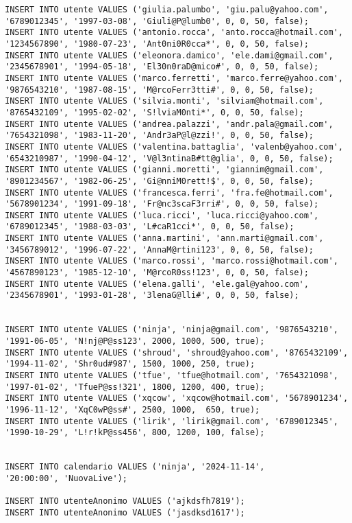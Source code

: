 \begin{lstlisting}
INSERT INTO utente VALUES ('giulia.palumbo', 'giu.palu@yahoo.com',
'6789012345', '1997-03-08', 'Giuli@P@lumb0', 0, 0, 50, false);
INSERT INTO utente VALUES ('antonio.rocca', 'anto.rocca@hotmail.com',
'1234567890', '1980-07-23', 'Ant0ni0R0cca*', 0, 0, 50, false);
INSERT INTO utente VALUES ('eleonora.damico', 'ele.dami@gmail.com',
'2345678901', '1994-05-18', 'El30n0raD@mico#', 0, 0, 50, false);
INSERT INTO utente VALUES ('marco.ferretti', 'marco.ferre@yahoo.com',
'9876543210', '1987-08-15', 'M@rcoFerr3tti#', 0, 0, 50, false);
INSERT INTO utente VALUES ('silvia.monti', 'silviam@hotmail.com',
'8765432109', '1995-02-02', 'S!lviaM0nti*', 0, 0, 50, false);
INSERT INTO utente VALUES ('andrea.palazzi', 'andr.pala@gmail.com',
'7654321098', '1983-11-20', 'Andr3aP@l@zzi!', 0, 0, 50, false);
INSERT INTO utente VALUES ('valentina.battaglia', 'valenb@yahoo.com',
'6543210987', '1990-04-12', 'V@l3ntinaB#tt@glia', 0, 0, 50, false);
INSERT INTO utente VALUES ('gianni.moretti', 'giannim@gmail.com',
'8901234567', '1982-06-25', 'Gi@nniM0rett!$', 0, 0, 50, false);
INSERT INTO utente VALUES ('francesca.ferri', 'fra.fe@hotmail.com',
'5678901234', '1991-09-18', 'Fr@nc3scaF3rri#', 0, 0, 50, false);
INSERT INTO utente VALUES ('luca.ricci', 'luca.ricci@yahoo.com',
'6789012345', '1988-03-03', 'L#caR1cci*', 0, 0, 50, false);
INSERT INTO utente VALUES ('anna.martini', 'ann.marti@gmail.com',
'3456789012', '1996-07-22', 'AnnaM@rtini123', 0, 0, 50, false);
INSERT INTO utente VALUES ('marco.rossi', 'marco.rossi@hotmail.com',
'4567890123', '1985-12-10', 'M@rcoR0ss!123', 0, 0, 50, false);
INSERT INTO utente VALUES ('elena.galli', 'ele.gal@yahoo.com',
'2345678901', '1993-01-28', '3lenaG@lli#', 0, 0, 50, false);


INSERT INTO utente VALUES ('ninja', 'ninja@gmail.com', '9876543210', 
'1991-06-05', 'N!nj@P@ss123', 2000, 1000, 500, true);
INSERT INTO utente VALUES ('shroud', 'shroud@yahoo.com', '8765432109',
'1994-11-02', 'Shr0ud#987', 1500, 1000, 250, true);
INSERT INTO utente VALUES ('tfue', 'tfue@hotmail.com', '7654321098',
'1997-01-02', 'TfueP@ss!321', 1800, 1200, 400, true);
INSERT INTO utente VALUES ('xqcow', 'xqcow@hotmail.com', '5678901234',
'1996-11-12', 'XqC0wP@ss#', 2500, 1000,  650, true);
INSERT INTO utente VALUES ('lirik', 'lirik@gmail.com', '6789012345',
'1990-10-29', 'L!r!kP@ss456', 800, 1200, 100, false);


INSERT INTO calendario VALUES ('ninja', '2024-11-14', 
'20:00:00', 'NuovaLive');

INSERT INTO utenteAnonimo VALUES ('ajkdsfh7819');
INSERT INTO utenteAnonimo VALUES ('jasdksd1617');


\end{lstlisting}
